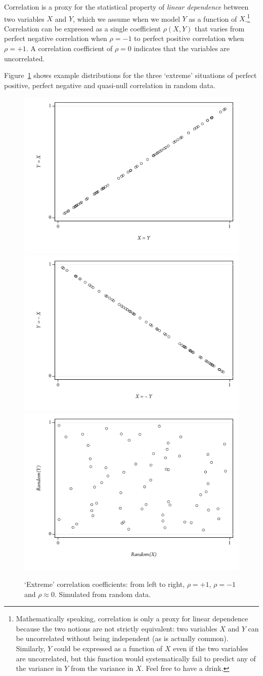   Correlation is a proxy for the statistical property of \emph{linear dependence} between two variables $X$ and $Y$, which we assume when we model $Y$ as a function of $X$.\footnote{Mathematically speaking, correlation is only a proxy for linear dependence because the two notions are not strictly equivalent: two variables $X$ and $Y$ can be uncorrelated without being independent (as is actually common). Similarly, $Y$ could be expressed as a function of $X$ even if the two variables are uncorrelated, but this function would systematically fail to predict any of the variance in $Y$ from the variance in $X$. Feel free to have a drink.} Correlation can be expressed as a single coefficient $\rho (X,Y)$ that varies from perfect negative correlation when $\rho = -1$ to perfect positive correlation when $\rho = +1$. A correlation coefficient of $\rho = 0$ indicates that the variables are uncorrelated.

  Figure~\ref{fig:correlation_examples} shows example distributions for the three `extreme' situations of perfect positive, perfect negative and quasi-null correlation in random data.

  \begin{figure}[htp]
  	\centering
  	\includegraphics[width=.32\textwidth]{images/correlate_pos.pdf}
  	\includegraphics[width=.32\textwidth]{images/correlate_neg.pdf}
  	\includegraphics[width=.32\textwidth]{images/correlate_rnd.pdf}

  	\caption[`Extreme' correlation coefficients]{\label{fig:correlation_examples}%
  	`Extreme' correlation coefficients: from left to right, %
    $\rho = +1$, $\rho = -1$ and $\rho \approx 0$. %
    Simulated from random data.}
  \end{figure}%

